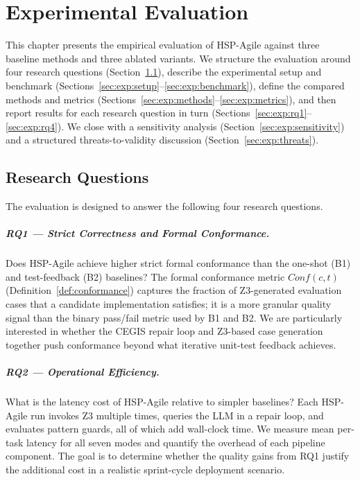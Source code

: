 \chapter{Experimental Evaluation}
\label{ch:experiments}

This chapter presents the empirical evaluation of HSP-Agile against three baseline
methods and three ablated variants.  We structure the evaluation around four research
questions (Section~\ref{sec:exp:rq}), describe the experimental setup and benchmark
(Sections~\ref{sec:exp:setup}--\ref{sec:exp:benchmark}), define the compared methods
and metrics (Sections~\ref{sec:exp:methods}--\ref{sec:exp:metrics}), and then report
results for each research question in turn
(Sections~\ref{sec:exp:rq1}--\ref{sec:exp:rq4}).  We close with a sensitivity
analysis (Section~\ref{sec:exp:sensitivity}) and a structured threats-to-validity
discussion (Section~\ref{sec:exp:threats}).

\section{Research Questions}
\label{sec:exp:rq}

The evaluation is designed to answer the following four research questions.

\paragraph{RQ1 --- Strict Correctness and Formal Conformance.}
Does HSP-Agile achieve higher strict formal conformance than the one-shot (B1) and
test-feedback (B2) baselines?  The formal conformance metric $\mathit{Conf}(c,t)$
(Definition~\ref{def:conformance}) captures the fraction of Z3-generated evaluation
cases that a candidate implementation satisfies; it is a more granular quality signal
than the binary pass/fail metric used by B1 and B2.  We are particularly interested
in whether the CEGIS repair loop and Z3-based case generation together push
conformance beyond what iterative unit-test feedback achieves.

\paragraph{RQ2 --- Operational Efficiency.}
What is the latency cost of HSP-Agile relative to simpler baselines?  Each HSP-Agile
run invokes Z3 multiple times, queries the LLM in a repair loop, and evaluates pattern
guards, all of which add wall-clock time.  We measure mean per-task latency for all
seven modes and quantify the overhead of each pipeline component.  The goal is to
determine whether the quality gains from RQ1 justify the additional cost in a
realistic sprint-cycle deployment scenario.

